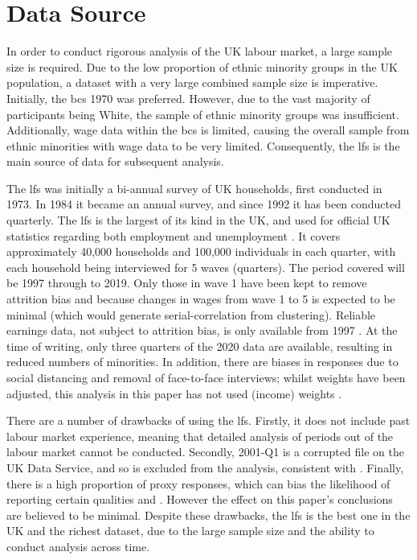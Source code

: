 \documentclass[class=article, crop=false]{standalone}
\begin{document}
\section{Data Source}
\label{sec:Data}
In order to conduct rigorous analysis of the UK labour market, a large sample size is required. Due to the low proportion of ethnic minority groups in the UK population, a dataset with a very large combined sample size is imperative. Initially, the \acrfull{bcs} 1970 was preferred. However, due to the vast majority of participants being White, the sample of ethnic minority groups was insufficient. Additionally, wage data within the \acrshort{bcs} is limited, causing the overall sample from ethnic minorities with wage data to be very limited. Consequently, the \acrfull{lfs} is the main source of data for subsequent analysis.

The \acrshort{lfs} was initially a bi-annual survey of UK households, first conducted in 1973. In 1984 it became an annual survey, and since 1992 it has been conducted quarterly. The \acrshort{lfs} is the largest of its kind in the UK, and used for official UK statistics regarding both employment and unemployment \citep{ONS}. It covers approximately 40,000 households and 100,000 individuals in each quarter, with each household being interviewed for 5 waves (quarters). The period covered will be 1997 through to 2019. Only those in wave 1 have been kept to remove attrition bias and because changes in wages from wave 1 to 5 is expected to be minimal (which would generate serial-correlation from clustering). Reliable earnings data, not subject to attrition bias, is only available from 1997 \citep{ONSa}. At the time of writing, only three quarters of the 2020 data are available, resulting in reduced numbers of minorities. In addition, there are biases in responses due to social distancing and removal of face-to-face interviews; whilst weights have been adjusted, this analysis in this paper has not used (income) weights \citep{ONSb}. 

There are a number of drawbacks of using the \acrshort{lfs}. Firstly, it does not include past labour market experience, meaning that detailed analysis of periods out of the labour market cannot be conducted. Secondly, 2001-Q1 is a corrupted file on the UK Data Service, and so is excluded from the analysis, consistent with \citet{Longhi}. Finally, there is a high proportion of proxy responses, which can bias the likelihood of reporting certain qualities \citep{Clarke} and \citep{Davies}. However the effect on this paper's conclusions are believed to be minimal. Despite these drawbacks, the \acrshort{lfs} is the best one in the UK and the richest dataset, due to the large sample size and the ability to conduct analysis across time.
\end{document}
